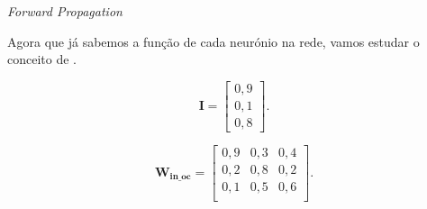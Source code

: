 \begin{frame}{\textit{Forward Propagation}}
	
	Agora que já sabemos a função de cada neurónio na rede, vamos estudar o conceito de .
	    
	\begin{figure}
		\centering
		
	\end{figure}
	    
	\begin{multicols}{2}
		\centering    
		\begin{equation}
			\mathbf{I} = \begin{bmatrix}
			0,9\\ 
			0,1\\ 
			0,8
			\end{bmatrix}.
		\end{equation}    	
		        
		\begin{equation}
			\mathbf{W_{\text{in\_oc}}} = \begin{bmatrix}
			0,9 & 0,3 & 0,4 \\ 
			0,2 & 0,8 & 0,2 \\
			0,1 & 0,5 & 0,6 \\
			\end{bmatrix}.
		\end{equation}    	
	\end{multicols}
	
\end{frame}

